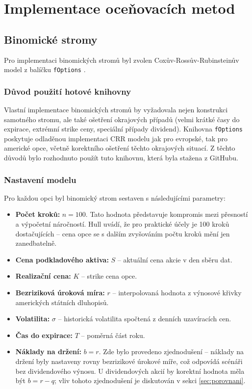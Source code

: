 
\section{Implementace oceňovacích metod}

\subsection{Binomické stromy}

Pro implementaci binomických stromů byl zvolen Coxův-Rossův-Rubinsteinův model z balíčku \texttt{fOptions} \citep{fOptions}.

\subsubsection{Důvod použití hotové knihovny}

Vlastní implementace binomických stromů by vyžadovala nejen konstrukci samotného stromu, ale také ošetření okrajových případů (velmi krátké časy do expirace, extrémní strike ceny, speciální případy dividend). Knihovna \texttt{fOptions} poskytuje odladěnou implementaci CRR modelu jak pro evropské, tak pro americké opce, včetně korektního ošetření těchto okrajových situací. Z těchto důvodů bylo rozhodnuto použít tuto knihovnu, která byla stažena z GitHubu.

\subsubsection{Nastavení modelu}

Pro každou opci byl binomický strom sestaven s následujícími parametry:
\begin{itemize}
  \item \textbf{Počet kroků:} \(n = 100\). Tato hodnota představuje kompromis mezi přesností a výpočetní náročností. Hull \citep{Hull2021} uvádí, že pro praktické účely je 100 kroků dostačujících – cena opce se s dalším zvyšováním počtu kroků mění jen zanedbatelně.
  \item \textbf{Cena podkladového aktiva:} \(S\) – aktuální cena akcie v den sběru dat.
  \item \textbf{Realizační cena:} \(K\) – strike cena opce.
  \item \textbf{Bezriziková úroková míra:} \(r\) – interpolovaná hodnota z výnosové křivky amerických státních dluhopisů.
  \item \textbf{Volatilita:} \(\sigma\) – historická volatilita spočtená z denních uzavíracích cen.
  \item \textbf{Čas do expirace:} \(T\) – poměrná část roku.
  \item \textbf{Náklady na držení:} \(b = r\). Zde bylo provedeno zjednodušení – náklady na držení byly nastaveny rovny bezrizikové úrokové míře, což odpovídá scénáři bez dividendového výnosu. U dividendových akcií by korektní hodnota měla být \(b = r - q\); vliv tohoto zjednodušení je diskutován v sekci \ref{sec:porovnani}.
\end{itemize}

